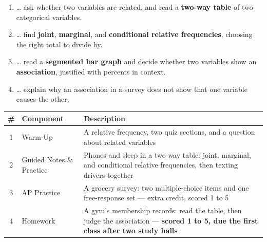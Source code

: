 \documentclass[12pt]{article}
\begin{document}

\namedateperiod
\vspace{0.18in}

\boxguard[14]
\begin{learningtargetbox}
\small
\begin{enumerate}[leftmargin=1.5em, itemsep=5pt]
  \item \ldots{} ask whether two variables are related, and read a \textbf{two-way table} of
        two categorical variables.
  \item \ldots{} find \textbf{joint}, \textbf{marginal}, and \textbf{conditional relative
        frequencies}, choosing the right total to divide by.
  \item \ldots{} read a \textbf{segmented bar graph} and decide whether two variables show an
        \textbf{association}, justified with percents in context.
  \item \ldots{} explain why an association in a survey does not show that one variable causes
        the other.
\end{enumerate}
\end{learningtargetbox}

\vspace{0.14in}

\boxguard[14]
\begin{tocbox}
\small
\renewcommand{\arraystretch}{1.5}
\begin{tabularx}{\linewidth}{@{} c l X @{}}
\rowcolor{sky}
\textbf{\#} & \textbf{Component} & \textbf{Description} \\
\midrule
1 & Warm-Up & A relative frequency, two quiz sections, and a question about related
                 variables \\
2 & Guided Notes \& Practice & Phones and sleep in a two-way table: joint, marginal, and
                 conditional relative frequencies, then texting drivers together \\
3 & AP Practice & A grocery survey: two multiple-choice items and one free-response set ---
                 extra credit, scored 1 to 5 \\
4 & Homework & A gym's membership records: read the table, then judge the association ---
                 \textbf{scored 1 to 5, due the first class after two study halls} \\
\end{tabularx}
\end{tocbox}
\end{document}
